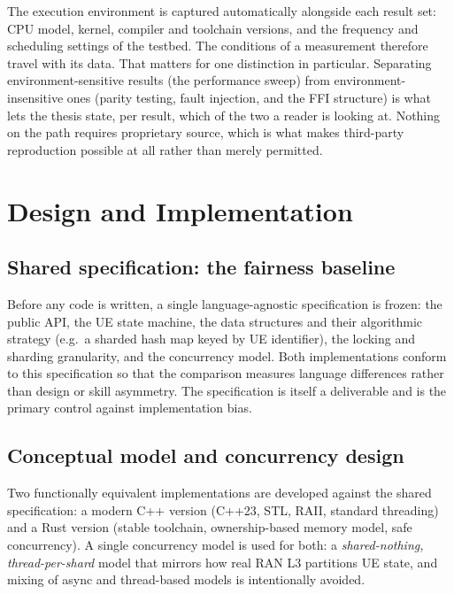 \documentclass[english,twoside,openright,a4paper,censored,csm,software-track-2020]{HYthesisML}
\begin{document}
The execution environment is captured automatically alongside each result set: CPU model,
kernel, compiler and toolchain versions, and the frequency and scheduling settings of the
testbed. The conditions of a measurement therefore travel with its data. That matters for one
distinction in particular. Separating environment-sensitive results (the performance sweep) from
environment-insensitive ones (parity testing, fault injection, and the FFI structure) is what
lets the thesis state, per result, which of the two a reader is looking at. Nothing on the path
requires proprietary source, which is what makes third-party reproduction possible at all rather
than merely permitted.

\chapter{Design and Implementation\label{chapter:design}}

\section{Shared specification: the fairness baseline}
\label{sec:fairness}
Before any code is written, a single language-agnostic specification is frozen: the public
API, the UE state machine, the data structures and their algorithmic strategy (e.g.\ a
sharded hash map keyed by UE identifier), the locking and sharding granularity, and the
concurrency model. Both implementations conform to this specification so that the comparison
measures language differences rather than design or skill asymmetry. The specification is
itself a deliverable and is the primary control against implementation bias.

\section{Conceptual model and concurrency design}\label{sec:concurrency}
Two functionally equivalent implementations are developed against the shared specification:
a modern C++ version (C++23, STL, RAII, standard threading) and a Rust version (stable
toolchain, ownership-based memory model, safe concurrency). A single concurrency model is
used for both: a \emph{shared-nothing, thread-per-shard} model that mirrors how real RAN L3
partitions UE state, and mixing of async and thread-based models is intentionally avoided.
\end{document}
